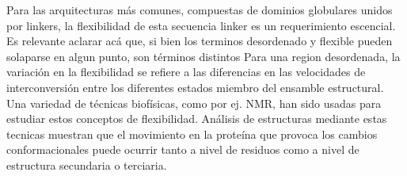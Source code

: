 Para las arquitecturas más comunes, compuestas de dominios globulares unidos por linkers, la flexibilidad de esta secuencia linker es un requerimiento escencial.
Es relevante aclarar acá que, si bien los terminos desordenado y flexible pueden solaparse en algun punto, son términos distintos\cite{radivojac2004protein}
Para una region desordenada, la variación en la flexibilidad se refiere a las diferencias en las velocidades de interconversión entre los diferentes estados miembro del ensamble estructural.
Una variedad de técnicas biofísicas, como por ej. NMR, han sido usadas para estudiar estos conceptos de flexibilidad.
Análisis de estructuras mediante estas tecnicas muestran que el movimiento en la proteína que provoca los cambios conformacionales puede ocurrir tanto a nivel de residuos como a nivel de estructura secundaria o terciaria. 




% 

